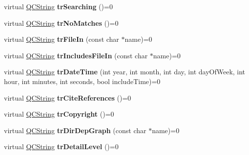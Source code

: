 \begin{DoxyCompactItemize}
\item 
\hypertarget{class_translator_aff3abe07c07a4709181d7c84141ae155}{virtual \hyperlink{class_q_c_string}{Q\-C\-String} {\bfseries tr\-Searching} ()=0}\label{class_translator_aff3abe07c07a4709181d7c84141ae155}

\item 
\hypertarget{class_translator_ae57b3a464e4737dfa4a41ac05fc489e0}{virtual \hyperlink{class_q_c_string}{Q\-C\-String} {\bfseries tr\-No\-Matches} ()=0}\label{class_translator_ae57b3a464e4737dfa4a41ac05fc489e0}

\item 
\hypertarget{class_translator_a11462227fdfa892b8bc06f6ca29c3817}{virtual \hyperlink{class_q_c_string}{Q\-C\-String} {\bfseries tr\-File\-In} (const char $\ast$name)=0}\label{class_translator_a11462227fdfa892b8bc06f6ca29c3817}

\item 
\hypertarget{class_translator_a72379cd4d5f03d949ccf451539b8d456}{virtual \hyperlink{class_q_c_string}{Q\-C\-String} {\bfseries tr\-Includes\-File\-In} (const char $\ast$name)=0}\label{class_translator_a72379cd4d5f03d949ccf451539b8d456}

\item 
\hypertarget{class_translator_a7beaa482757338d119a615099614cb16}{virtual \hyperlink{class_q_c_string}{Q\-C\-String} {\bfseries tr\-Date\-Time} (int year, int month, int day, int day\-Of\-Week, int hour, int minutes, int seconds, bool include\-Time)=0}\label{class_translator_a7beaa482757338d119a615099614cb16}

\item 
\hypertarget{class_translator_a3f109ef536c7b5841624887f152ec2e8}{virtual \hyperlink{class_q_c_string}{Q\-C\-String} {\bfseries tr\-Cite\-References} ()=0}\label{class_translator_a3f109ef536c7b5841624887f152ec2e8}

\item 
\hypertarget{class_translator_abbb166dcdb379785cf46d492d0b9c86e}{virtual \hyperlink{class_q_c_string}{Q\-C\-String} {\bfseries tr\-Copyright} ()=0}\label{class_translator_abbb166dcdb379785cf46d492d0b9c86e}

\item 
\hypertarget{class_translator_ae56543060bccb87d0bad61f87792fdda}{virtual \hyperlink{class_q_c_string}{Q\-C\-String} {\bfseries tr\-Dir\-Dep\-Graph} (const char $\ast$name)=0}\label{class_translator_ae56543060bccb87d0bad61f87792fdda}

\item 
\hypertarget{class_translator_ae67b2d1beacdf6b584f91296d46d777e}{virtual \hyperlink{class_q_c_string}{Q\-C\-String} {\bfseries tr\-Detail\-Level} ()=0}\label{class_translator_ae67b2d1beacdf6b584f91296d46d777e}


\end{DoxyCompactItemize}
